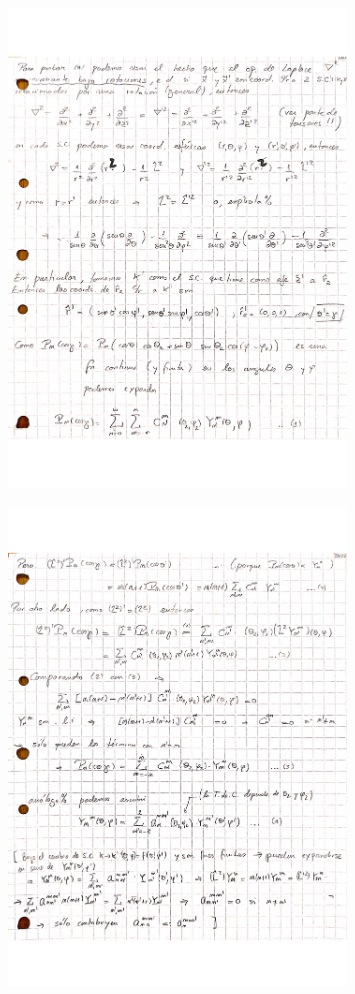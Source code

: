 \begin{figure}[H]
\centering
\includegraphics[angle=0,width=0.8\textwidth]{figs/FM2-01_9.pdf}
\end{figure}
\begin{figure}[H]
\centering
\includegraphics[angle=0,width=0.8\textwidth]{figs/FM2-01_10.pdf}
\end{figure}
